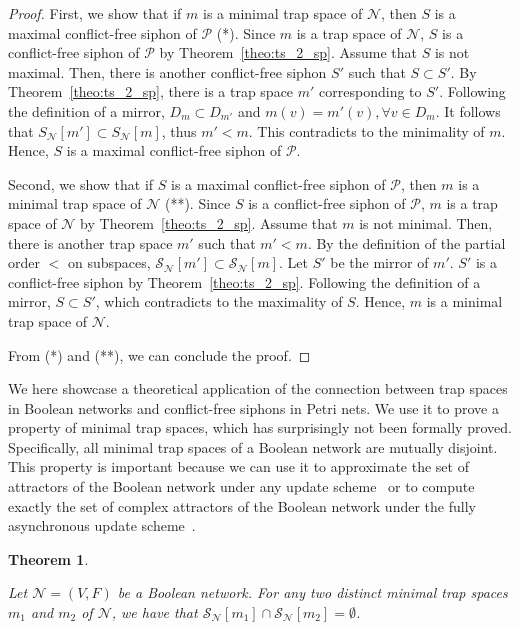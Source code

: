 \documentclass[preprint,12pt]{elsarticle}
\newtheorem{theorem}{Theorem}[section]
\begin{document}
\begin{proof}

  First, we show that if \(m\) is a minimal trap space of \(\mathcal{N}\), then \(S\) is a maximal conflict-free siphon of \(\mathcal{P}\) (*).
  Since \(m\) is a trap space of \(\mathcal{N}\), \(S\) is a conflict-free siphon of \(\mathcal{P}\) by Theorem~\ref{theo:ts_2_sp}. Assume that \(S\) is not maximal.
  Then, there is another conflict-free siphon \(S'\) such that \(S \subset S'\).
  By Theorem~\ref{theo:ts_2_sp}, there is a trap space \(m'\) corresponding to \(S'\).
  Following the definition of a mirror, \(D_m \subset D_{m'}\) and \(m(v) = m'(v), \forall v \in D_m\).
  It follows that \(S_{\mathcal{N}}[m'] \subset S_{\mathcal{N}}[m]\), thus \(m' < m\).
  This contradicts to the minimality of \(m\).
  Hence, \(S\) is a maximal conflict-free siphon of \(\mathcal{P}\).

  Second, we show that if \(S\) is a maximal conflict-free siphon of \(\mathcal{P}\), then \(m\) is a minimal trap space of \(\mathcal{N}\) (**).
  Since \(S\) is a conflict-free siphon of \(\mathcal{P}\), \(m\) is a trap space of \(\mathcal{N}\) by Theorem~\ref{theo:ts_2_sp}.
  Assume that \(m\) is not minimal.
  Then, there is another trap space \(m'\) such that \(m' < m\).
  By the definition of the partial order \(<\) on subspaces, \(\mathcal{S}_{\mathcal{N}}[m'] \subset \mathcal{S}_{\mathcal{N}}[m]\). Let \(S'\) be the mirror of \(m'\).
  \(S'\) is a conflict-free siphon by Theorem~\ref{theo:ts_2_sp}.
  Following the definition of a mirror, \(S \subset S'\), which contradicts to the maximality of \(S\).
  Hence, \(m\) is a minimal trap space of \(\mathcal{N}\).

  From (*) and (**), we can conclude the proof.
\end{proof}

We here showcase a theoretical application of the connection between trap spaces in Boolean networks and conflict-free siphons in Petri nets.
We use it to prove a property of minimal trap spaces, which has surprisingly not been formally proved.
Specifically, all minimal trap spaces of a Boolean network are mutually disjoint.
This property is important because we can use it to approximate the set of attractors of the Boolean network under any update scheme~\cite{klarner2015computing} or to compute exactly the set of complex attractors of the Boolean network under the fully asynchronous update scheme~\cite{DBLP:conf/bcb/TrinhHB22}.

\begin{theorem}%
\label{theo:separation_min_ts}

  Let \(\mathcal{N} = (V, F)\) be a Boolean network.
  For any two distinct minimal trap spaces \(m_1\) and \(m_2\) of \(\mathcal{N}\), we have that \(\mathcal{S}_{\mathcal{N}}[m_1] \cap \mathcal{S}_{\mathcal{N}}[m_2] = \emptyset\).

\end{theorem}
\end{document}

